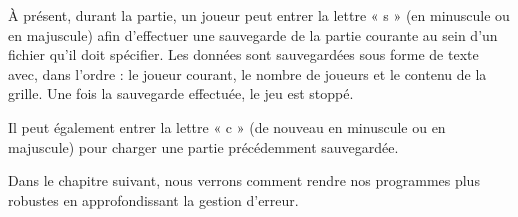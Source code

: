 À présent, durant la partie, un joueur peut entrer la lettre « s » (en
minuscule ou en majuscule) afin d'effectuer une sauvegarde de la partie
courante au sein d'un fichier qu'il doit spécifier. Les données sont
sauvegardées sous forme de texte avec, dans l'ordre : le joueur courant,
le nombre de joueurs et le contenu de la grille. Une fois la sauvegarde
effectuée, le jeu est stoppé.

Il peut également entrer la lettre « c » (de nouveau en minuscule ou en
majuscule) pour charger une partie précédemment sauvegardée.

\hrulefill

Dans le chapitre suivant, nous verrons comment rendre nos programmes plus
robustes en approfondissant la gestion d'erreur.